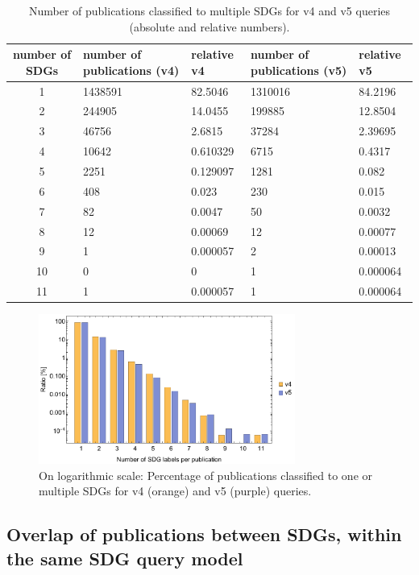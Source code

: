 \documentclass{article}
\begin{document}
\begin{table}[H]
 \begin{tabular}{cllll}
 \toprule
 number of SDGs & number of publications (v4) & relative v4 & number of publications (v5) & relative v5 \\
 \hline
 1 & 1438591 & 82.5046 & 1310016 & 84.2196 \\
 2 & 244905 & 14.0455 & 199885 & 12.8504 \\
 3 & 46756 & 2.6815 & 37284 & 2.39695 \\
 4 & 10642 & 0.610329 & 6715 & 0.4317 \\
 5 & 2251 & 0.129097 & 1281 & 0.082 \\
 6 & 408 & 0.023 & 230 & 0.015 \\
 7 & 82 & 0.0047 & 50 & 0.0032 \\
 8 & 12 & 0.00069 & 12 & 0.00077 \\
 9 & 1 & 0.000057 & 2 & 0.00013 \\
 10 & 0 & 0 & 1 & 0.000064 \\
 11 & 1 & 0.000057 & 1 & 0.000064 \\
 \bottomrule
\end{tabular} \caption{Number of publications classified to multiple SDGs for v4 and v5 queries (absolute and relative numbers).}
\label{multipleSDGs}
\end{table}

\begin{figure}[H]
	\centering
  \includegraphics[width=0.75\textwidth]{figures/histogram-multipleSDGlabels-barchartv4+v5.pdf}
	\caption{On logarithmic scale: Percentage of publications classified to one or multiple SDGs for v4 (orange) and v5 (purple) queries.}
\end{figure}

\subsection{Overlap of publications between SDGs, within the same SDG query model}
\end{document}
